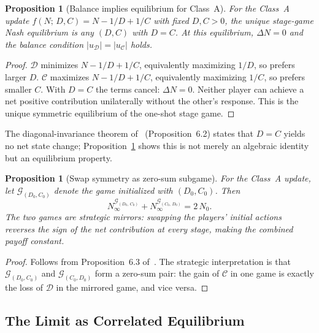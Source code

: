 \documentclass[12pt]{article}
\newtheorem{proposition}[theorem]{Proposition}
\theoremstyle{definition}
\theoremstyle{remark}
\begin{document}
\begin{proposition}[Balance implies equilibrium for Class~A]
\label{prop:classA-equilibrium}
For the Class~A update $f(N;\, D, C) = N - 1/D + 1/C$ with fixed $D, C > 0$, the
unique stage-game Nash equilibrium is any $(D, C)$ with $D = C$.  At this equilibrium,
$\Delta N = 0$ and the balance condition $\lvert u_{\mathcal{D}} \rvert =
\lvert u_{\mathcal{C}} \rvert$ holds.
\end{proposition}

\begin{proof}
$\mathcal{D}$ minimizes $N - 1/D + 1/C$, equivalently maximizing $1/D$, so prefers
larger $D$.  $\mathcal{C}$ maximizes $N - 1/D + 1/C$, equivalently maximizing $1/C$,
so prefers smaller $C$.  With $D = C$ the terms cancel: $\Delta N = 0$.  Neither player
can achieve a net positive contribution unilaterally without the other's response.  This
is the unique symmetric equilibrium of the one-shot stage game.
\end{proof}

The diagonal-invariance theorem of~\cite{Mil26a} (Proposition~6.2) states that $D = C$
yields no net state change; Proposition~\ref{prop:classA-equilibrium} shows this is not
merely an algebraic identity but an equilibrium property.

\begin{proposition}[Swap symmetry as zero-sum subgame]
\label{prop:swap-zerosim}
For the Class~A update, let $\mathcal{G}_{(D_0, C_0)}$ denote the game initialized with
$(D_0, C_0)$.  Then
\[
  N_\infty^{\mathcal{G}_{(D_0,\, C_0)}} + N_\infty^{\mathcal{G}_{(C_0,\, D_0)}}
  = 2\, N_0.
\]
The two games are strategic mirrors: swapping the players' initial actions reverses the
sign of the net contribution at every stage, making the combined payoff constant.
\end{proposition}

\begin{proof}
Follows from Proposition~6.3 of~\cite{Mil26a}.  The strategic interpretation is that
$\mathcal{G}_{(D_0, C_0)}$ and $\mathcal{G}_{(C_0, D_0)}$ form a zero-sum pair: the
gain of $\mathcal{C}$ in one game is exactly the loss of $\mathcal{D}$ in the mirrored
game, and vice versa.
\end{proof}

\subsection{The Limit as Correlated Equilibrium}
\end{document}
